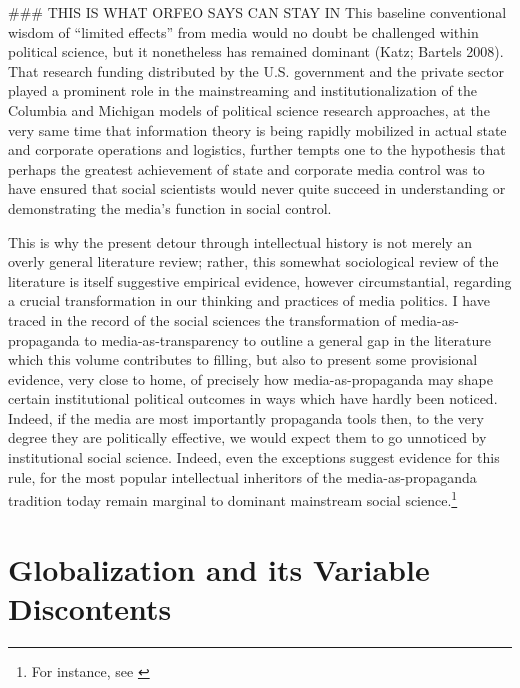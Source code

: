 ### THIS IS WHAT ORFEO SAYS CAN STAY IN
This baseline
conventional wisdom of ``limited effects'' from media would no doubt be challenged within political
science, but it nonetheless has remained dominant (Katz; Bartels 2008). That research funding
distributed by the U.S. government and the private sector played a prominent role in the
mainstreaming and institutionalization of the Columbia and Michigan models of political science
research approaches, at the very same time that information theory is being rapidly mobilized in
actual state and corporate operations and logistics, further tempts one to the hypothesis that
perhaps the greatest achievement of state and corporate media control was to have ensured that
social scientists would never quite succeed in understanding or demonstrating the media's function
in social control.

This is why the present detour through intellectual history is not merely an overly general
literature review; rather, this somewhat sociological review of the literature is itself suggestive
empirical evidence, however circumstantial, regarding a crucial transformation in our thinking and
practices of media politics. I have traced in the record of the social sciences the transformation
of media-as-propaganda to media-as-transparency to outline a general gap in the literature which
this volume contributes to filling, but also to present some provisional evidence, very close to
home, of precisely how media-as-propaganda may shape certain institutional political outcomes in
ways which have hardly been noticed. Indeed, if the media are most importantly propaganda tools
then, to the very degree they are politically effective, we would expect them to go unnoticed by
institutional social science. Indeed, even the exceptions suggest evidence for this rule, for the
most popular intellectual inheritors of the media-as-propaganda tradition today remain marginal to
dominant mainstream social science.\footnote{For instance, see
\citealt{Herman:1988ta,mcchesney2000rich,luhmann2000reality}}


\section{Globalization and its Variable Discontents}

